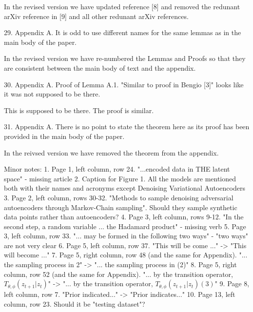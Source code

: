 \documentclass{article}
\begin{document}
{\color{red} In the revised version we have updated reference [8] and removed the redunant arXiv reference in [9] and all other redunant arXiv references.\\}

{\color{blue}
29. Appendix A. It is odd to use different names for the same lemmas as in the main body of the paper.\\
}

{\color{red} In the revised version we have re-numbered the Lemmas and Proofs so that they are consistent between the main body of text and the appendix.\\}

{\color{blue}
30. Appendix A. Proof of Lemma A.1. "Similar to proof in Bengio [3]" looks like it was not supposed to be there.\\
}

{\color{red} This is supposed to be there. The proof is similar.\\}

{\color{blue}
31. Appendix A. There is no point to state the theorem here as its proof has been provided in the main body of the paper. \\
}

{\color{red} In the reivsed version we have removed the theorem from the appendix.\\}

Minor notes:
1. Page 1, left column, row 24. "...encoded data in THE latent space" - missing article
2. Caption for Figure 1. All the models are mentioned both with their names and acronyms except Denoising Variational Autoencoders
3. Page 2, left column, rows 30-32. "Methods to sample denoising adversarial autoencoders through Markov-Chain sampling". Should they sample synthetic data points rather than autoencoders?
4. Page 3, left column, rows 9-12. "In the second step, a random variable ... the Hadamard product" - missing verb
5. Page 3, left column, row 33. "... may be formed in the following two ways" - "two ways" are not very clear
6. Page 5, left column, row 37. "This will be come ..." -> "This will become ..."
7. Page 5, right column, row 48 (and the same for Appendix). "... the sampling process in 2" -> "... the sampling process in (2)"
8. Page 5, right column, row 52 (and the same for Appendix). "... by the transition operator, $T_{\theta, \phi}(z_{t+1}|z_t)$" -> "... by the transition operator, $T_{\theta, \phi}(z_{t+1}|z_t) (3)$"
9. Page 8, left column, row 7. "Prior indicated..." -> "Prior indicates..."
10. Page 13, left column, row 23. Should it be "testing dataset"?
\end{document}
